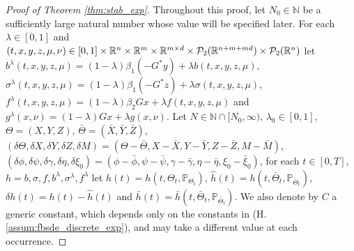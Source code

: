 \documentclass[11pt]{article}
\numberwithin{equation}{section}
\theoremstyle{definition}
\theoremstyle{remark}
\def\b{\beta}  \def\a{\alpha} \def\ga{\gamma}
\def\cP{\mathcal{P}}
\def\sN{{\mathbb{N}}}
\def\sP{\mathbb{P}}
\def\sR{{\mathbb R}}
\begin{document}
\begin{proof}[Proof of Theorem \ref{thm:stab_exp}]
Throughout this proof, 
let $N_0\in \sN$ be a sufficiently large natural number whose value will be specified later.
For each $\lambda\in [0,1]$ and $(t,x,y,z,\mu,\nu)\in [0,1]\t \sR^n\t\sR^m\t\sR^{m\t d}\t\cP_2(\sR^{n+m+m d})\t \cP_2(\sR^n)$ 
let 
$b^\lambda(t,x,y,z,\mu)=
(1-\lambda)\b_1 (-G^*y)+\lambda b(t,x,y,z,\mu)$,
$\sigma^\lambda(t,x,y,z,\mu)=
(1-\lambda)\b_1 (-G^*z)+\lambda \sigma(t,x,y,z,\mu)$,
$f^\lambda(t,x,y,z,\mu)=
(1-\lambda)\b_2 Gx+\lambda f(t,x,y,z,\mu)$
and $g^\lambda(x,\nu)=(1-\lambda)Gx+\lambda g(x,\nu)$.
Let 
$N\in \sN\cap [N_0,\infty)$, $\lambda_0\in [0,1]$,
$\Theta=(X, Y, Z)$,  
$\bar{\Theta}=(\bar{X}, \bar{Y}, \bar{Z})$,
$(\delta \Theta, \delta X,\delta Y, \delta Z, \delta M)= ( \Theta-\bar{ \Theta}, X-\bar{X}, Y-\bar{Y}, Z-\bar{Z}, M-\bar{M})$,
$(\delta \phi, \delta \psi,\delta \gamma, \delta \eta, \delta \xi_0)= (\phi-\bar{\phi},\psi-\bar{\psi},\gamma-\bar{\gamma},\eta-\bar{\eta}, \xi_0-\bar{\xi}_0)$,
for each $t\in [0,T]$, 
$h=b, \sigma, f, b^\lambda, \sigma^\lambda, f^\lambda$
let 
${h}(t)= h(t, {\Theta}_t,\sP_{{\Theta}_t})$,
$\hat{h}(t)= h(t, \bar{\Theta}_t,\sP_{\bar{\Theta}_t})$,
$\delta {h}(t)=h(t)- \hat{h}(t)$
and $\bar{h}(t)= \bar{h}(t, \bar{\Theta}_t,\sP_{\bar{\Theta}_t})$.
We also denote by $C$ a generic constant, 
which
depends only on the constants in (H.\ref{assum:fbsde_discrete_exp}),
and  may take a different value at each occurrence.


\end{proof}
\end{document}
